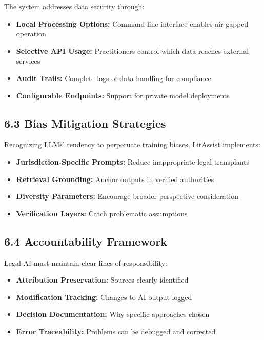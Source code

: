\documentclass[12pt,a4paper]{article}
\begin{document}
The system addresses data security through:

\begin{itemize}
\item \textbf{Local Processing Options:} Command-line interface enables air-gapped operation
\item \textbf{Selective API Usage:} Practitioners control which data reaches external services
\item \textbf{Audit Trails:} Complete logs of data handling for compliance
\item \textbf{Configurable Endpoints:} Support for private model deployments
\end{itemize}

\subsection*{6.3 Bias Mitigation Strategies}

Recognizing LLMs' tendency to perpetuate training biases, LitAssist implements:

\begin{itemize}
\item \textbf{Jurisdiction-Specific Prompts:} Reduce inappropriate legal transplants
\item \textbf{Retrieval Grounding:} Anchor outputs in verified authorities
\item \textbf{Diversity Parameters:} Encourage broader perspective consideration
\item \textbf{Verification Layers:} Catch problematic assumptions
\end{itemize}

\subsection*{6.4 Accountability Framework}

Legal AI must maintain clear lines of responsibility:

\begin{itemize}
\item \textbf{Attribution Preservation:} Sources clearly identified
\item \textbf{Modification Tracking:} Changes to AI output logged
\item \textbf{Decision Documentation:} Why specific approaches chosen
\item \textbf{Error Traceability:} Problems can be debugged and corrected
\end{itemize}
\end{document}
